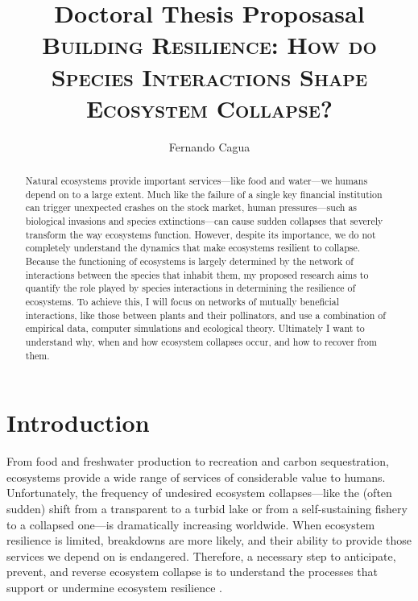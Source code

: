 \documentclass[a4paper]{article}
\title{
	{\normalsize Doctoral Thesis Proposasal} \\
	{\LARGE \textsc{Building Resilience: How do Species Interactions Shape Ecosystem Collapse?}}
}
\author{
  {\large Fernando Cagua}
}
\date{}
\begin{document}
\maketitle

\begin{abstract}
  Natural ecosystems provide important services---like food and water---we humans depend on to a large extent.
  Much like the failure of a single key financial institution can trigger unexpected crashes on the stock market, human pressures---such as biological invasions and species extinctions---can cause sudden collapses that severely transform the way ecosystems function.
  However, despite its importance, we do not completely understand the dynamics that make ecosystems resilient to collapse.
  Because the functioning of ecosystems is largely determined by the network of interactions between the species that inhabit them, my proposed research aims to quantify the role played by species interactions in determining the resilience of ecosystems.
  To achieve this, I will focus on networks of mutually beneficial interactions, like those between plants and their pollinators, and use a combination of empirical data, computer simulations and ecological theory.
  Ultimately I want to understand why, when and how ecosystem collapses occur, and how to recover from them.
\end{abstract}









\section*{Introduction}

From food and freshwater production to recreation and carbon sequestration, ecosystems provide a wide range of services of considerable value to humans.
Unfortunately, the frequency of undesired ecosystem collapses---like the (often sudden) shift from a transparent to a turbid lake or from a self-sustaining fishery to a collapsed one---is dramatically increasing worldwide\autocite{Scheffer2001a}.
When ecosystem resilience is limited, breakdowns are more likely, and their ability to provide those services we depend on is endangered.
Therefore, a necessary step to anticipate, prevent, and reverse ecosystem collapse is to understand the processes that support or undermine ecosystem resilience \autocite{Hughes2005, Tylianakis2008}.
\end{document}
